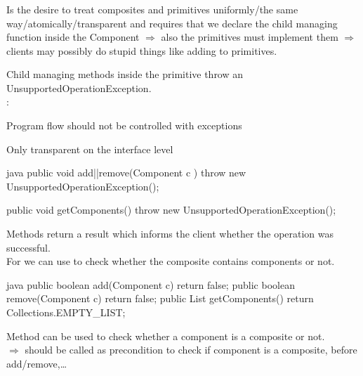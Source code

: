 \subsubsection{}
\begin{sectionbox}\nospacing
  Is the desire to treat composites and primitives uniformly/the same
  way/atomically/transparent and requires that we declare the child managing
  function inside the Component $\Rightarrow$ also the primitives must implement
  them $\Rightarrow$ clients may possibly do stupid things like adding to
  primitives.
\end{sectionbox}
\begin{sectionbox}[Solution 1]\nospacing
  Child managing methods inside the primitive throw an
  UnsupportedOperationException.\\
  :
  \begin{itemizenosep}
      \item Program flow should not be controlled with exceptions
      \item Only transparent on the interface level
  \end{itemizenosep}
\end{sectionbox}
\begin{codeboxNl}{java}
  public void add|\optc{/}|remove(Component c ){
    throw new UnsupportedOperationException();
  }
 
  public void getComponents(){
    throw new UnsupportedOperationException();
  }
\end{codeboxNl}
\begin{sectionbox}[Solution 2]\nospacing
  Methods return a  result which informs the client whether
  the operation was successful.\\
  For  we can use
   to check whether the composite contains
  components or not.
\end{sectionbox}
\begin{codeboxNl}{java}
  public boolean add(Component c) { return false; }
  public boolean remove(Component c) { return false; }
  public List getComponents() {return Collections.EMPTY_LIST;}
\end{codeboxNl}
\begin{sectionbox}[Solution 3]\nospacing
Method  can be used to check whether a component is a
composite or not.\\
$\Rightarrow$  should be called as precondition to
check if component is a composite, before add/remove,\ldots
\end{sectionbox}
